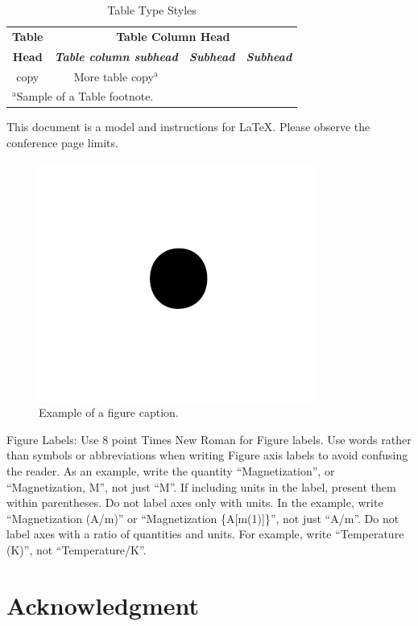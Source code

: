 \documentclass[conference]{IEEEtran}
\begin{document}
\begin{table}[htbp]
\caption{Table Type Styles}
\begin{center}
\begin{tabular}{|c|c|c|c|}
\hline
\textbf{Table}&\multicolumn{3}{|c|}{\textbf{Table Column Head}} \\
\cline{2-4} 
\textbf{Head} & \textbf{\textit{Table column subhead}}& \textbf{\textit{Subhead}}& \textbf{\textit{Subhead}} \\
\hline
copy& More table copy$^{\mathrm{a}}$& &  \\
\hline
\multicolumn{4}{l}{$^{\mathrm{a}}$Sample of a Table footnote.}
\end{tabular}This document is a model and instructions for \LaTeX.
Please observe the conference page limits. 
\label{tab1}
\end{center}
\end{table}

\begin{figure}[htbp]
\centerline{\includegraphics{fig1.png}}
\caption{Example of a figure caption.}
\label{fig}
\end{figure}

Figure Labels: Use 8 point Times New Roman for Figure labels. Use words 
rather than symbols or abbreviations when writing Figure axis labels to 
avoid confusing the reader. As an example, write the quantity 
``Magnetization'', or ``Magnetization, M'', not just ``M''. If including 
units in the label, present them within parentheses. Do not label axes only 
with units. In the example, write ``Magnetization (A/m)'' or ``Magnetization 
\{A[m(1)]\}'', not just ``A/m''. Do not label axes with a ratio of 
quantities and units. For example, write ``Temperature (K)'', not 
``Temperature/K''.

\section*{Acknowledgment}
\end{document}
